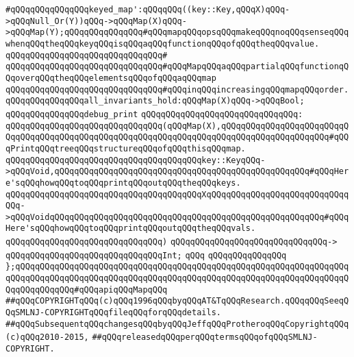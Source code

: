 \verb|#qQQqqQQqqQQqqQQqkeyed_map':qQQqqQQq((key::Key,qQQqX)qQQq->qQQqNull_Or(Y))qQQq->qQQqMap(X)qQQq->qQQqMap(Y);qQQqqQQqqQQqqQQq#qQQqmapqQQqopsqQQqmakeqQQqnoqQQqsenseqQQqwhenqQQqtheqQQqkeyqQQqisqQQqaqQQqfunctionqQQqofqQQqtheqQQqvalue.|\newline
\verb|qQQqqQQqqQQqqQQqqQQqqQQqqQQqqQQq#|\newline
\verb|qQQqqQQqqQQqqQQqqQQqqQQqqQQqqQQq#qQQqMapqQQqaqQQqpartialqQQqfunctionqQQqoverqQQqtheqQQqelementsqQQqofqQQqaqQQqmap|\newline
\verb|qQQqqQQqqQQqqQQqqQQqqQQqqQQqqQQq#qQQqinqQQqincreasingqQQqmapqQQqorder.|\newline
\newline
\newline
\verb|qQQqqQQqqQQqqQQqall_invariants_hold:qQQqMap(X)qQQq->qQQqBool;|\newline
\newline
\verb|qQQqqQQqqQQqqQQqdebug_print|\newline
\verb|qQQqqQQqqQQqqQQqqQQqqQQqqQQqqQQq:|\newline
\verb|qQQqqQQqqQQqqQQqqQQqqQQqqQQqqQQq(qQQqMap(X),qQQqqQQqqQQqqQQqqQQqqQQqqQQqqQQqqQQqqQQqqQQqqQQqqQQqqQQqqQQqqQQqqQQqqQQqqQQqqQQqqQQqqQQqqQQq#qQQqPrintqQQqtreeqQQqstructureqQQqofqQQqthisqQQqmap.|\newline
\verb|qQQqqQQqqQQqqQQqqQQqqQQqqQQqqQQqqQQqqQQqkey::KeyqQQq->qQQqVoid,qQQqqQQqqQQqqQQqqQQqqQQqqQQqqQQqqQQqqQQqqQQqqQQqqQQq#qQQqHere'sqQQqhowqQQqtoqQQqprintqQQqoutqQQqtheqQQqkeys.|\newline
\verb|qQQqqQQqqQQqqQQqqQQqqQQqqQQqqQQqqQQqqQQqXqQQqqQQqqQQqqQQqqQQqqQQqqQQqqQQq->qQQqVoidqQQqqQQqqQQqqQQqqQQqqQQqqQQqqQQqqQQqqQQqqQQqqQQqqQQqqQQq#qQQqHere'sqQQqhowqQQqtoqQQqprintqQQqoutqQQqtheqQQqvals.|\newline
\verb|qQQqqQQqqQQqqQQqqQQqqQQqqQQqqQQq)|\newline
\verb|qQQqqQQqqQQqqQQqqQQqqQQqqQQqqQQq->|\newline
\verb|qQQqqQQqqQQqqQQqqQQqqQQqqQQqqQQqInt;|\newline
\verb|qQQq|\newline
\verb|qQQqqQQqqQQqqQQq|\newline
\newline
\verb|};qQQqqQQqqQQqqQQqqQQqqQQqqQQqqQQqqQQqqQQqqQQqqQQqqQQqqQQqqQQqqQQqqQQqqQQqqQQqqQQqqQQqqQQqqQQqqQQqqQQqqQQqqQQqqQQqqQQqqQQqqQQqqQQqqQQqqQQqqQQqqQQqqQQqqQQq#qQQqapiqQQqMapqQQq|\newline
\newline
\newline
\verb|##qQQqCOPYRIGHTqQQq(c)qQQq1996qQQqbyqQQqAT&TqQQqResearch.qQQqqQQqSeeqQQqSMLNJ-COPYRIGHTqQQqfileqQQqforqQQqdetails.|\newline
\verb|##qQQqSubsequentqQQqchangesqQQqbyqQQqJeffqQQqProtheroqQQqCopyrightqQQq(c)qQQq2010-2015,|\newline
\verb|##qQQqreleasedqQQqperqQQqtermsqQQqofqQQqSMLNJ-COPYRIGHT.|\newline

